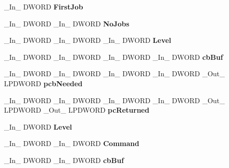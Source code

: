 \begin{DoxyCompactItemize}
\+\_\+\+In\+\_\+ D\+W\+O\+RD {\bfseries First\+Job}
\item 
\mbox{\label{struct___p_r_i_n_t_p_r_o_v_i_d_o_r_ac0d727ab7dde229a95d70b2207d0143d}} 
\+\_\+\+In\+\_\+ D\+W\+O\+RD \+\_\+\+In\+\_\+ D\+W\+O\+RD {\bfseries No\+Jobs}
\item 
\mbox{\label{struct___p_r_i_n_t_p_r_o_v_i_d_o_r_a908dff2bb9b1bb7440e937bec945eed6}} 
\+\_\+\+In\+\_\+ D\+W\+O\+RD \+\_\+\+In\+\_\+ D\+W\+O\+RD \+\_\+\+In\+\_\+ D\+W\+O\+RD {\bfseries Level}
\item 
\mbox{\label{struct___p_r_i_n_t_p_r_o_v_i_d_o_r_a6fec37d021bb1f622dd835f284d2c70f}} 
\+\_\+\+In\+\_\+ D\+W\+O\+RD \+\_\+\+In\+\_\+ D\+W\+O\+RD \+\_\+\+In\+\_\+ D\+W\+O\+RD \+\_\+\+In\+\_\+ D\+W\+O\+RD {\bfseries cb\+Buf}
\item 
\mbox{\label{struct___p_r_i_n_t_p_r_o_v_i_d_o_r_ad64f330302a9592629fa687dc7557ce4}} 
\+\_\+\+In\+\_\+ D\+W\+O\+RD \+\_\+\+In\+\_\+ D\+W\+O\+RD \+\_\+\+In\+\_\+ D\+W\+O\+RD \+\_\+\+In\+\_\+ D\+W\+O\+RD \+\_\+\+Out\+\_\+ L\+P\+D\+W\+O\+RD {\bfseries pcb\+Needed}
\item 
\mbox{\label{struct___p_r_i_n_t_p_r_o_v_i_d_o_r_a6d5f74d1ad50edc25d7c317b79dbc493}} 
\+\_\+\+In\+\_\+ D\+W\+O\+RD \+\_\+\+In\+\_\+ D\+W\+O\+RD \+\_\+\+In\+\_\+ D\+W\+O\+RD \+\_\+\+In\+\_\+ D\+W\+O\+RD \+\_\+\+Out\+\_\+ L\+P\+D\+W\+O\+RD \+\_\+\+Out\+\_\+ L\+P\+D\+W\+O\+RD {\bfseries pc\+Returned}
\item 
\mbox{\label{struct___p_r_i_n_t_p_r_o_v_i_d_o_r_a8029083bfd896099954d260a08953b11}} 
\+\_\+\+In\+\_\+ D\+W\+O\+RD {\bfseries Level}
\item 
\mbox{\label{struct___p_r_i_n_t_p_r_o_v_i_d_o_r_af1b85bce2412f00cafe0e80c8269331f}} 
\+\_\+\+In\+\_\+ D\+W\+O\+RD \+\_\+\+In\+\_\+ D\+W\+O\+RD {\bfseries Command}
\item 
\mbox{\label{struct___p_r_i_n_t_p_r_o_v_i_d_o_r_a94a44d83c039a389e171a25dd741c224}} 
\+\_\+\+In\+\_\+ D\+W\+O\+RD \+\_\+\+In\+\_\+ D\+W\+O\+RD {\bfseries cb\+Buf}

\end{DoxyCompactItemize}
